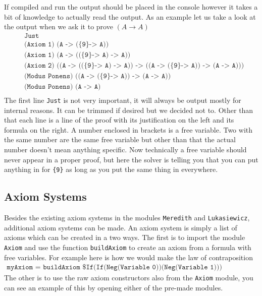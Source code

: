 \documentclass{article}
\begin{document}
If compiled and run the output should be placed in the console however it takes a bit of knowledge to actually read the output.
As an example let us take a look at the output when we ask it to prove $(A\rightarrow A)$
\begin{align*}
&\texttt{Just} \\
&\texttt{(Axiom 1) (A -> (\{9\} -> A))} \\
&\texttt{(Axiom 1) (A -> ((\{9\} -> A) -> A))} \\
&\texttt{(Axiom 2) ((A -> ((\{9\} -> A) -> A)) -> ((A -> (\{9\} -> A)) -> (A -> A)))} \\
&\texttt{(Modus Ponens) ((A -> (\{9\} -> A)) -> (A -> A))} \\
&\texttt{(Modus Ponens) (A -> A)} \\
\end{align*}
The first line \texttt{Just} is not very important, it will always be output mostly for internal reasons.
It can be trimmed if desired but we decided not to.
Other than that each line is a line of the proof with its justification on the left and its formula on the right.
A number enclosed in brackets is a free variable.
Two with the same number are the same free variable but other than that the actual number doesn't mean anything specific.
Now technically a free variable should never appear in a proper proof, but here the solver is telling you that you can put anything in for \texttt{\{9\}} as long as you put the same thing in everywhere.

\subsection{Axiom Systems}

Besides the existing axiom systems in the modules \texttt{Meredith} and \texttt{Lukasiewicz}, additional axiom systems can be made.
An axiom system is simply a list of axioms which can be created in a two ways.
The first is to import the module \texttt{Axiom} and use the function \texttt{buildAxiom} to create an axiom from a formula with free variables.
For example here is how we would make the law of contraposition
\begin{align*}
\texttt{myAxiom = buildAxiom \$ If(If(Neg(Variable 0))(Neg(Variable 1)))(If(Variable 1)(Variable 0))}
\end{align*}
The other is to use the raw axiom constructors also from the \texttt{Axiom} module, you can see an example of this by opening either of the pre-made modules.
\end{document}
